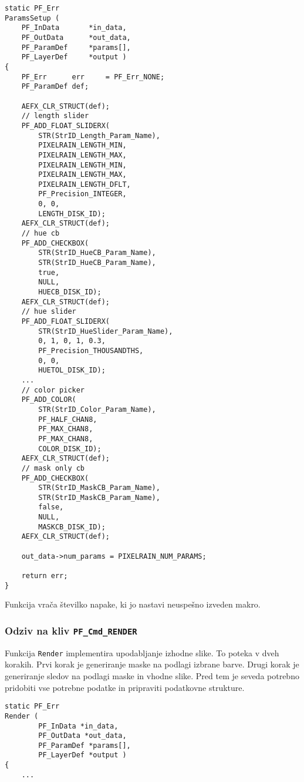 \documentclass[a4paper, 12pt]{book}
\begin{document}
\begin{verbatim}
static PF_Err 
ParamsSetup (   
    PF_InData       *in_data,
    PF_OutData      *out_data,
    PF_ParamDef     *params[],
    PF_LayerDef     *output )
{
    PF_Err      err     = PF_Err_NONE;
    PF_ParamDef def;    

    AEFX_CLR_STRUCT(def);
    // length slider
    PF_ADD_FLOAT_SLIDERX(   
        STR(StrID_Length_Param_Name), 
        PIXELRAIN_LENGTH_MIN, 
        PIXELRAIN_LENGTH_MAX, 
        PIXELRAIN_LENGTH_MIN, 
        PIXELRAIN_LENGTH_MAX, 
        PIXELRAIN_LENGTH_DFLT,
        PF_Precision_INTEGER,
        0, 0,
        LENGTH_DISK_ID);
    AEFX_CLR_STRUCT(def);
    // hue cb
    PF_ADD_CHECKBOX(    
        STR(StrID_HueCB_Param_Name),
        STR(StrID_HueCB_Param_Name),
        true,
        NULL,
        HUECB_DISK_ID);
    AEFX_CLR_STRUCT(def);
    // hue slider
    PF_ADD_FLOAT_SLIDERX(   
        STR(StrID_HueSlider_Param_Name),
        0, 1, 0, 1, 0.3,
        PF_Precision_THOUSANDTHS,
        0, 0,
        HUETOL_DISK_ID);
    ...
    // color picker
    PF_ADD_COLOR(   
        STR(StrID_Color_Param_Name), 
        PF_HALF_CHAN8,
        PF_MAX_CHAN8,
        PF_MAX_CHAN8,
        COLOR_DISK_ID);
    AEFX_CLR_STRUCT(def);
    // mask only cb
    PF_ADD_CHECKBOX(    
        STR(StrID_MaskCB_Param_Name),
        STR(StrID_MaskCB_Param_Name),
        false,
        NULL,
        MASKCB_DISK_ID);
    AEFX_CLR_STRUCT(def);

    out_data->num_params = PIXELRAIN_NUM_PARAMS;

    return err;
}
\end{verbatim}

Funkcija vrača številko napake, ki jo nastavi neuspešno izveden makro.


\subsubsection{Odziv na kliv \texttt{PF\_Cmd\_RENDER}}

Funkcija \texttt{Render} implementira upodabljanje izhodne slike.
To poteka v dveh korakih.
Prvi korak je generiranje maske na podlagi izbrane barve.
Drugi korak je generiranje sledov na podlagi maske in vhodne slike.
Pred tem je seveda potrebno pridobiti vse potrebne podatke in pripraviti podatkovne strukture.

\begin{verbatim}
static PF_Err 
Render (
        PF_InData *in_data,
        PF_OutData *out_data,
        PF_ParamDef *params[],
        PF_LayerDef *output )
{
    ...
\end{verbatim}
\end{document}
